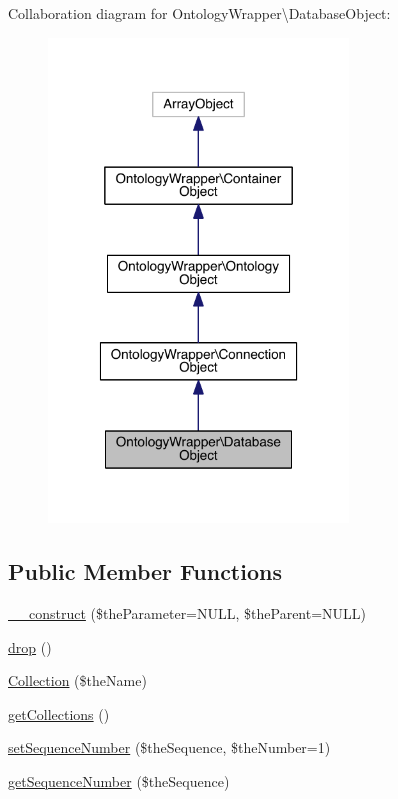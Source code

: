 Collaboration diagram for Ontology\-Wrapper\textbackslash{}Database\-Object\-:\nopagebreak
\begin{figure}[H]
\begin{center}
\leavevmode
\includegraphics[width=226pt]{class_ontology_wrapper_1_1_database_object__coll__graph}
\end{center}
\end{figure}
\subsection*{Public Member Functions}
\begin{DoxyCompactItemize}
\item 
\hyperlink{class_ontology_wrapper_1_1_database_object_a12746bd4b3a9a869544ccaa06cf3bf34}{\-\_\-\-\_\-construct} (\$the\-Parameter=N\-U\-L\-L, \$the\-Parent=N\-U\-L\-L)
\item 
\hyperlink{class_ontology_wrapper_1_1_database_object_a0a3f541e719b56e1191aaf75a0b58b03}{drop} ()
\item 
\hyperlink{class_ontology_wrapper_1_1_database_object_a58886acb97fd38139340f649f12254a5}{Collection} (\$the\-Name)
\item 
\hyperlink{class_ontology_wrapper_1_1_database_object_a23409291f9aebd68da532a77c5143a84}{get\-Collections} ()
\item 
\hyperlink{class_ontology_wrapper_1_1_database_object_a4c7bd0ce9eb62750ef1c84351ed565cd}{set\-Sequence\-Number} (\$the\-Sequence, \$the\-Number=1)
\item 
\hyperlink{class_ontology_wrapper_1_1_database_object_ab731d606a297f2b1980f457efa1bc80d}{get\-Sequence\-Number} (\$the\-Sequence)
\end{DoxyCompactItemize}
